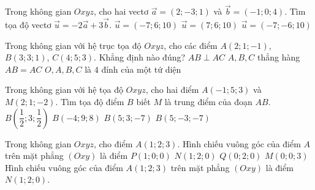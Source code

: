 \begin{ex}%
	Trong không gian $Oxyz$, cho hai vectơ $\overrightarrow{a}=(2;-3;1)$ và $\overrightarrow{b}=(-1;0;4)$. Tìm tọa độ vectơ $\overrightarrow{u}=-2\overrightarrow{a}+3\overrightarrow{b}$.
	{\True $\overrightarrow{u}=(-7;6;10)$}
	{$\overrightarrow{u}=(7;6;10)$}
	{$\overrightarrow{u}=(-7;-6;10)$}
\end{ex}
\begin{ex}%
	Trong không gian với hệ trục tọa độ $Oxyz$, cho các điểm $A\left(2; 1; -1\right)$, $B\left(3; 3; 1\right)$, $C\left(4; 5; 3\right)$. Khẳng định nào đúng?
	\choice
	{$AB\perp AC$}
	{\True $A, B, C$ thẳng hàng}
	{$AB = AC$}
	{$O, A, B, C$ là $4$ đỉnh của một tứ diện}
\end{ex}
\begin{ex}%
	Trong không gian với hệ tọa độ $ Oxyz $, cho hai điểm $ A(-1;5;3) $ và $ M(2;1;-2) $. Tìm tọa độ điểm $ B $ biết $ M $ là trung điểm của đoạn $ AB $.
	\choice
	{$ B\left(\dfrac{1}{2};3;\dfrac{1}{2}\right) $}
	{$ B(-4;9;8) $}
	{$ B(5;3;-7) $}
	{\True $ B(5;-3;-7) $}
\end{ex}
\begin{ex}%
	Trong không gian $Oxyz$, cho điểm $A(1;2;3)$. Hình chiếu vuông góc của điểm $A$ trên mặt phẳng $(Oxy)$ là điểm
	\choice
	{$P(1;0;0)$}
	{\True $N(1;2;0)$}
	{$Q(0;2;0)$}
	{$M(0;0;3)$}
	\loigiai
	{
		Hình chiếu vuông góc của điểm $A(1;2;3)$ trên mặt phẳng $(Oxy)$ là điểm $N(1;2;0)$.
	}
\end{ex}
